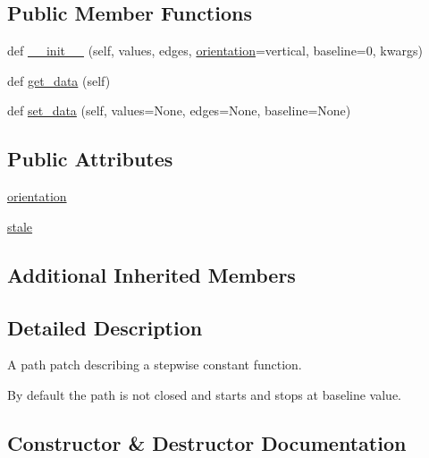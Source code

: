 \subsection*{Public Member Functions}
\begin{DoxyCompactItemize}
\item 
def \hyperlink{classmatplotlib_1_1patches_1_1StepPatch_af12af89b81c62017cb43beb6bab6301b}{\+\_\+\+\_\+init\+\_\+\+\_\+} (self, values, edges, \hyperlink{classmatplotlib_1_1patches_1_1StepPatch_abfc1efe4f3879c17a1275c841faf0ecc}{orientation}=\textquotesingle{}vertical\textquotesingle{}, baseline=0, kwargs)
\item 
def \hyperlink{classmatplotlib_1_1patches_1_1StepPatch_affe718205aa1c9f0169432f1579507a6}{get\+\_\+data} (self)
\item 
def \hyperlink{classmatplotlib_1_1patches_1_1StepPatch_a4e91e15ebca84eb49374321a251af2e1}{set\+\_\+data} (self, values=None, edges=None, baseline=None)
\end{DoxyCompactItemize}
\subsection*{Public Attributes}
\begin{DoxyCompactItemize}
\item 
\hyperlink{classmatplotlib_1_1patches_1_1StepPatch_abfc1efe4f3879c17a1275c841faf0ecc}{orientation}
\item 
\hyperlink{classmatplotlib_1_1patches_1_1StepPatch_a7f6e4514d12bc9e724c60ac45e8210d3}{stale}
\end{DoxyCompactItemize}
\subsection*{Additional Inherited Members}


\subsection{Detailed Description}
\begin{DoxyVerb}A path patch describing a stepwise constant function.

By default the path is not closed and starts and stops at
baseline value.
\end{DoxyVerb}
 

\subsection{Constructor \& Destructor Documentation}
\mbox{\label{classmatplotlib_1_1patches_1_1StepPatch_af12af89b81c62017cb43beb6bab6301b}} 

